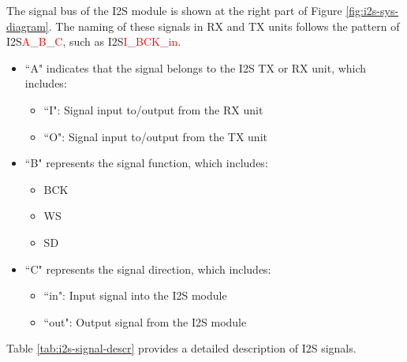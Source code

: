 \documentclass[main\_\_EN.tex]{subfiles}
\begin{document}
The signal bus of the I2S module is shown at the right part of Figure \ref{fig:i2s-sys-diagram}. The naming of these signals in RX and TX units follows the pattern of I2S\textcolor{red}{A}\_\textcolor{red}{B}\_\textcolor{red}{C}, such as I2S\textcolor{red}{I}\_\textcolor{red}{BCK}\_\textcolor{red}{in}.

\begin{itemize}
    \item ``A" indicates that the signal belongs to the I2S TX or RX unit, which includes:
    \begin{itemize}
        \item ``I": Signal input to/output from the RX unit
        \item ``O": Signal input to/output from the TX unit
    \end{itemize}
    \item ``B" represents the signal function, which includes:
    \begin{itemize}
        \item BCK
        \item WS
        \item SD
    \end{itemize}
    \item ``C" represents the signal direction, which includes:
    \begin{itemize}
        \item ``in": Input signal into the I2S module
        \item ``out": Output signal from the I2S module
    \end{itemize}
\end{itemize}

Table \ref{tab:i2s-signal-descr} provides a detailed description of I2S signals.
\end{document}
